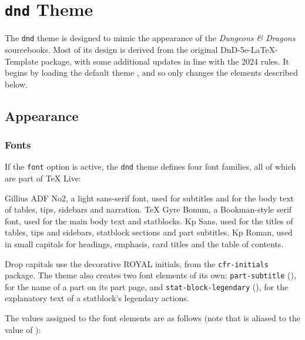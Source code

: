 
\clearpage
{}
\chapter{\texttt{dnd} Theme}\label{Theme:dnd}

	The \texttt{dnd} theme is designed to mimic the appearance of the \textit{Dungeons \& Dragons} sourcebooks. Most of its design is derived from the original DnD-5e-LaTeX-Template package, with some additional updates in line with the 2024 rules. It begins by loading the default theme , and so only changes the elements described below.

	\section{Appearance}
		\subsection{Fonts}

			If the \texttt{font} option is active, the \texttt{dnd} theme defines four font families, all of which are part of TeX Live:

			{
				{\gillius Gillius ADF No2}, a light sans-serif font, used for subtitles and for the body text of tables, tips, sidebars and narration.
			}
			{
				{\gyreBonum TeX Gyre Bonum}, a Bookman-style serif font, used for the main body text and statblocks.
			}
			{
				{\kepler Kp Sans}, used for the titles of tables, tips and sidebars, statblock sections and part subtitles.
			}
			{
				{\keplerserif Kp Roman}, used in small capitals for headings, emphasis, card titles and the table of contents.
			}

			Drop capitals use the decorative {\Royal ROYAL} initials, from the \texttt{cfr-initials} package. The theme also creates two font elements of its own: \texttt{part-subtitle} (), for the name of a part on its part page, and \texttt{stat-block-legendary} (), for the explanatory text of a statblock's legendary actions.

			The values assigned to the font elements are as follows (note that  is aliased to the value of ):

